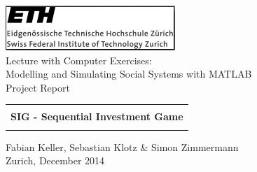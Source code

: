 \thispagestyle{empty}
\begin{center}
\includegraphics[scale=1]{ETHlogog.png}\\
\bigskip
\bigskip
\bigskip
\LARGE{ Lecture with Computer Exercises:\\ }
\LARGE{ Modelling and Simulating Social Systems with MATLAB\\}
\bigskip
\bigskip
\small{Project Report}\\
\bigskip
\bigskip
\bigskip
\bigskip
\begin{tabular}{|c|}
\hline
\\
\textbf{\LARGE{SIG - Sequential Investment Game}}\\
\\
\hline
\end{tabular}

\bigskip
\bigskip
\bigskip
\LARGE{Fabian Keller, Sebastian Klotz \& Simon Zimmermann}\\
\bigskip
\bigskip
\bigskip
\bigskip
\bigskip
\bigskip
\bigskip
\bigskip
Zurich, December 2014\\
\end{center}